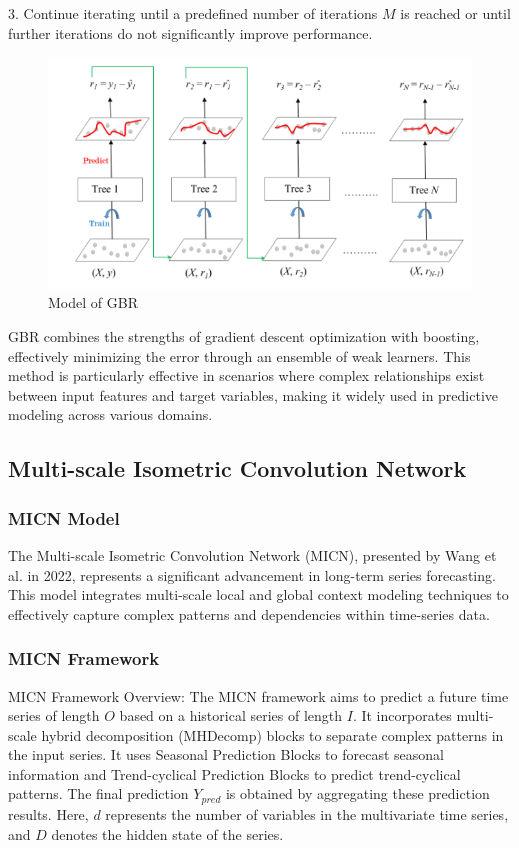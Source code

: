 \documentclass{ieeeojies}
\begin{document}
3. Continue iterating until a predefined number of iterations \( M \) is reached or until further iterations do not significantly improve performance.
\begin{figure}[H]
  \centering
  \begin{minipage}{0.8\linewidth}
    \centering
    \includegraphics[width=\linewidth]{bibliography/gradientboosting_fig.png}
    \caption{Model of GBR}
    \label{fig11}
  \end{minipage}
\end{figure}
GBR combines the strengths of gradient descent optimization with boosting, effectively minimizing the error through an ensemble of weak learners. This method is particularly effective in scenarios where complex relationships exist between input features and target variables, making it widely used in predictive modeling across various domains.

\subsection{Multi-scale Isometric Convolution Network}
\subsubsection{MICN Model}
The Multi-scale Isometric Convolution Network (MICN), presented by Wang et al. in 2022, represents a significant advancement in long-term series forecasting. This model integrates multi-scale local and global context modeling techniques to effectively capture complex patterns and dependencies within time-series data.
\subsubsection{MICN Framework}
MICN Framework Overview: The MICN framework aims to predict a future time series of length \( O \) based on a historical series of length \( I \). It incorporates multi-scale hybrid decomposition (MHDecomp) blocks to separate complex patterns in the input series. It uses Seasonal Prediction Blocks to forecast seasonal information and Trend-cyclical Prediction Blocks to predict trend-cyclical patterns. The final prediction \( Y_{pred} \) is obtained by aggregating these prediction results. Here, \( d \) represents the number of variables in the multivariate time series, and \( D \) denotes the hidden state of the series.
\end{document}
